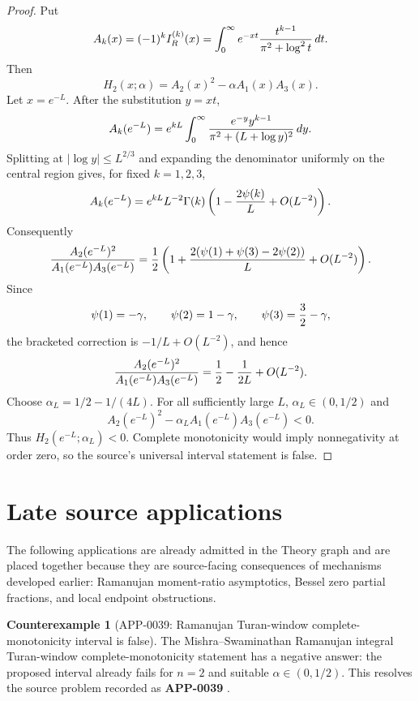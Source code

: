 \documentclass[11pt]{article}
\numberwithin{equation}{section}
\theoremstyle{definition}
\newtheorem{counterexample}[theorem]{Counterexample}
\theoremstyle{remark}
\newcommand{\1}{\mathbf 1}
\begin{document}
\begin{proof}
Put
\[
 A_k(x)=(-1)^kI_R^{(k)}(x)
 =\int_0^\infty e^{-xt}{t^{k-1}\over \pi^2+\log^2t}\,dt .
\]
Then
\[
 H_2(x;\alpha)=A_2(x)^2-\alpha A_1(x)A_3(x).
\]
Let \(x=e^{-L}\).  After the substitution \(y=xt\),
\[
 A_k(e^{-L})
 =
 e^{kL}\int_0^\infty
 {e^{-y}y^{k-1}\over \pi^2+(L+\log y)^2}\,dy .
\]
Splitting at \(|\log y|\le L^{2/3}\) and expanding the denominator uniformly
on the central region gives, for fixed \(k=1,2,3\),
\[
 A_k(e^{-L})
 =
 e^{kL}L^{-2}\Gamma(k)
 \left(1-{2\psi(k)\over L}+O(L^{-2})\right).
\]
Consequently
\[
 {A_2(e^{-L})^2\over A_1(e^{-L})A_3(e^{-L})}
 =
 {1\over2}
 \left(
 1+{2(\psi(1)+\psi(3)-2\psi(2))\over L}+O(L^{-2})
 \right).
\]
Since
\[
 \psi(1)=-\gamma,\qquad
 \psi(2)=1-\gamma,\qquad
 \psi(3)={3\over2}-\gamma,
\]
the bracketed correction is \(-1/L+O(L^{-2})\), and hence
\[
 {A_2(e^{-L})^2\over A_1(e^{-L})A_3(e^{-L})}
 =
 {1\over2}-{1\over2L}+O(L^{-2}).
\]
Choose \(\alpha_L=1/2-1/(4L)\).  For all sufficiently large \(L\),
\(\alpha_L\in(0,1/2)\) and
\[
 A_2(e^{-L})^2-\alpha_L A_1(e^{-L})A_3(e^{-L})<0.
\]
Thus \(H_2(e^{-L};\alpha_L)<0\).  Complete monotonicity would imply
nonnegativity at order zero, so the source's universal interval statement is
false.
\end{proof}

\section{Late source applications}
\label{sec:late-source-applications}
The following applications are already admitted in the Theory graph and are placed together because they are source-facing consequences of mechanisms developed earlier: Ramanujan moment-ratio asymptotics, Bessel zero partial fractions, and local endpoint obstructions.

\begin{counterexample}[APP-0039: Ramanujan Turan-window complete-monotonicity interval is false]
\label{res:ramanujan-turan-window-negative-answer}
The Mishra--Swaminathan Ramanujan integral Turan-window complete-monotonicity statement has a negative answer: the proposed interval already fails for \(n=2\) and suitable \(\alpha\in(0,1/2)\).  This resolves the source problem recorded as \textbf{APP-0039} \cite{mishra-swaminathan-ramanujan}.
\end{counterexample}
\end{document}

